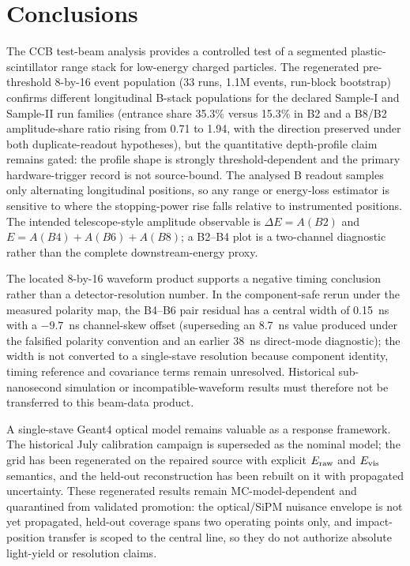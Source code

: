 \section{Conclusions}

The CCB test-beam analysis provides a controlled test of a segmented plastic-scintillator range stack for low-energy charged particles. The regenerated pre-threshold 8-by-16 event population (33 runs, 1.1M events, run-block bootstrap) confirms different longitudinal B-stack populations for the declared Sample-I and Sample-II run families (entrance share 35.3\% versus 15.3\% in B2 and a B8/B2 amplitude-share ratio rising from 0.71 to 1.94, with the direction preserved under both duplicate-readout hypotheses), but the quantitative depth-profile claim remains gated: the profile shape is strongly threshold-dependent and the primary hardware-trigger record is not source-bound. The analysed B readout samples only alternating longitudinal positions, so any range or energy-loss estimator is sensitive to where the stopping-power rise falls relative to instrumented positions. The intended telescope-style amplitude observable is \(\Delta E=A(B2)\) and \(E=A(B4)+A(B6)+A(B8)\); a B2--B4 plot is a two-channel diagnostic rather than the complete downstream-energy proxy.

The located 8-by-16 waveform product supports a negative timing conclusion rather than a detector-resolution number. In the component-safe rerun under the measured polarity map, the B4--B6 pair residual has a central width of 0.15~ns with a $-9.7$~ns channel-skew offset (superseding an 8.7~ns value produced under the falsified polarity convention and an earlier 38~ns direct-mode diagnostic); the width is not converted to a single-stave resolution because component identity, timing reference and covariance terms remain unresolved. Historical sub-nanosecond simulation or incompatible-waveform results must therefore not be transferred to this beam-data product.

A single-stave Geant4 optical model remains valuable as a response framework. The historical July calibration campaign is superseded as the nominal model; the grid has been regenerated on the repaired source with explicit $E_{\rm raw}$ and $E_{\rm vis}$ semantics, and the held-out reconstruction has been rebuilt on it with propagated uncertainty. These regenerated results remain MC-model-dependent and quarantined from validated promotion: the optical/SiPM nuisance envelope is not yet propagated, held-out coverage spans two operating points only, and impact-position transfer is scoped to the central line, so they do not authorize absolute light-yield or resolution claims.

